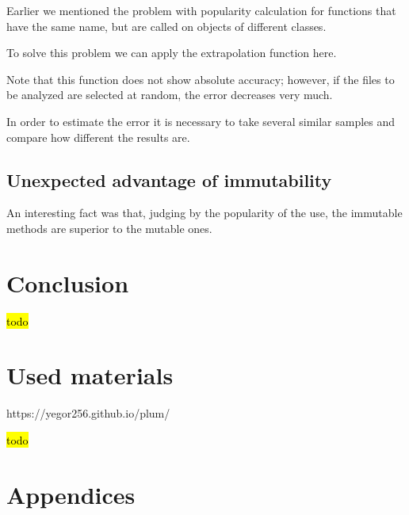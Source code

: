 \documentclass[anonymous,sigplan,review,11pt,nonacm,natbib=false]{acmart}
\begin{document}
    Earlier we mentioned the problem with popularity calculation for functions that have the same name, but are called on objects of different classes.

    To solve this problem we can apply the extrapolation function here.

    Note that this function does not show absolute accuracy; however, if the files to be analyzed are selected at random, the error decreases very much.

    In order to estimate the error it is necessary to take several similar samples and compare how different the results are.

    \subsection{Unexpected advantage of immutability}

    An interesting fact was that, judging by the popularity of the use, the immutable methods are superior to the mutable ones.

    \section{Conclusion}\label{sec:conclusion}

    \hl{todo}

    \section{Used materials}

    https://yegor256.github.io/plum/

    \hl{todo}

    \section{Appendices}

    \label{table 1}
\end{document}
